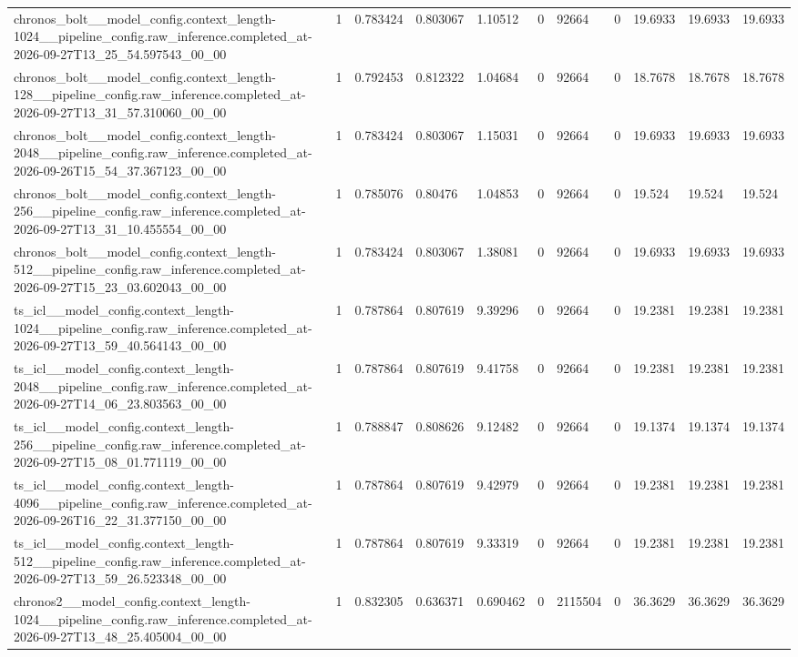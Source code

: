 \begin{tabular}{lllllllllll}
chronos\_bolt\_\_model\_config.context\_length-1024\_\_pipeline\_config.raw\_inference.completed\_at-2026-09-27T13\_25\_54.597543\_00\_00 & 1 & 0.783424 & 0.803067 & 1.10512 & 0 & 92664 & 0 & 19.6933 & 19.6933 & 19.6933 \\
chronos\_bolt\_\_model\_config.context\_length-128\_\_pipeline\_config.raw\_inference.completed\_at-2026-09-27T13\_31\_57.310060\_00\_00 & 1 & 0.792453 & 0.812322 & 1.04684 & 0 & 92664 & 0 & 18.7678 & 18.7678 & 18.7678 \\
chronos\_bolt\_\_model\_config.context\_length-2048\_\_pipeline\_config.raw\_inference.completed\_at-2026-09-26T15\_54\_37.367123\_00\_00 & 1 & 0.783424 & 0.803067 & 1.15031 & 0 & 92664 & 0 & 19.6933 & 19.6933 & 19.6933 \\
chronos\_bolt\_\_model\_config.context\_length-256\_\_pipeline\_config.raw\_inference.completed\_at-2026-09-27T13\_31\_10.455554\_00\_00 & 1 & 0.785076 & 0.80476 & 1.04853 & 0 & 92664 & 0 & 19.524 & 19.524 & 19.524 \\
chronos\_bolt\_\_model\_config.context\_length-512\_\_pipeline\_config.raw\_inference.completed\_at-2026-09-27T15\_23\_03.602043\_00\_00 & 1 & 0.783424 & 0.803067 & 1.38081 & 0 & 92664 & 0 & 19.6933 & 19.6933 & 19.6933 \\
ts\_icl\_\_model\_config.context\_length-1024\_\_pipeline\_config.raw\_inference.completed\_at-2026-09-27T13\_59\_40.564143\_00\_00 & 1 & 0.787864 & 0.807619 & 9.39296 & 0 & 92664 & 0 & 19.2381 & 19.2381 & 19.2381 \\
ts\_icl\_\_model\_config.context\_length-2048\_\_pipeline\_config.raw\_inference.completed\_at-2026-09-27T14\_06\_23.803563\_00\_00 & 1 & 0.787864 & 0.807619 & 9.41758 & 0 & 92664 & 0 & 19.2381 & 19.2381 & 19.2381 \\
ts\_icl\_\_model\_config.context\_length-256\_\_pipeline\_config.raw\_inference.completed\_at-2026-09-27T15\_08\_01.771119\_00\_00 & 1 & 0.788847 & 0.808626 & 9.12482 & 0 & 92664 & 0 & 19.1374 & 19.1374 & 19.1374 \\
ts\_icl\_\_model\_config.context\_length-4096\_\_pipeline\_config.raw\_inference.completed\_at-2026-09-26T16\_22\_31.377150\_00\_00 & 1 & 0.787864 & 0.807619 & 9.42979 & 0 & 92664 & 0 & 19.2381 & 19.2381 & 19.2381 \\
ts\_icl\_\_model\_config.context\_length-512\_\_pipeline\_config.raw\_inference.completed\_at-2026-09-27T13\_59\_26.523348\_00\_00 & 1 & 0.787864 & 0.807619 & 9.33319 & 0 & 92664 & 0 & 19.2381 & 19.2381 & 19.2381 \\
chronos2\_\_model\_config.context\_length-1024\_\_pipeline\_config.raw\_inference.completed\_at-2026-09-27T13\_48\_25.405004\_00\_00 & 1 & 0.832305 & 0.636371 & 0.690462 & 0 & 2115504 & 0 & 36.3629 & 36.3629 & 36.3629 \\

\end{tabular}
